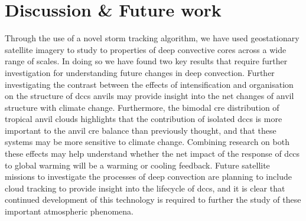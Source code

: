 
\section{Discussion \& Future work}

Through the use of a novel storm tracking algorithm, we have used geostationary satellite imagery to study to properties of deep convective cores across a wide range of scales. In doing so we have found two key results that require further investigation for understanding future changes in deep convection. Further investigating the contrast between the effects of intensification and organisation on the structure of \acrshort{dcc}s anvils may provide insight into the net changes of anvil structure with climate change. Furthermore, the bimodal \acrshort{cre} distribution of tropical anvil clouds highlights that the contribution of isolated \acrshort{dcc}s is more important to the anvil \acrshort{cre} balance than previously thought, and that these systems may be more sensitive to climate change. Combining research on both these effects may help understand whether the net impact of the response of \acrshort{dcc}s to global warming will be a warming or cooling feedback. Future satellite missions to investigate the processes of deep convection are planning to include cloud tracking to provide insight into the lifecycle of \acrshort{dcc}s, and it is clear that continued development of this technology is required to further the study of these important atmospheric phenomena.



